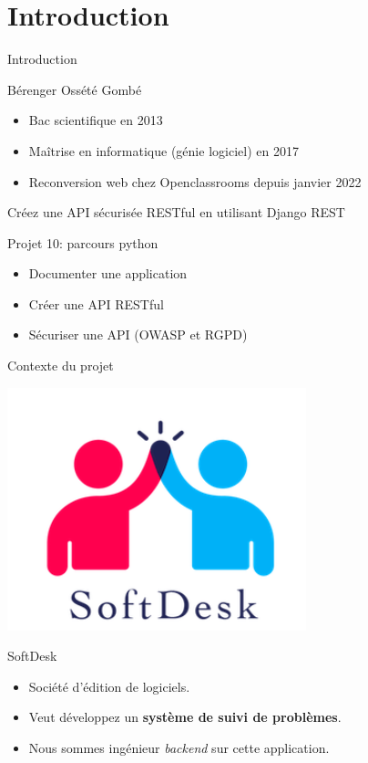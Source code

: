 \section{Introduction}

\begin{frame}{Introduction}
  \begin{block}{Bérenger Ossété Gombé}
    \begin{itemize}
    \item Bac scientifique en 2013
    \item Maîtrise en informatique (génie logiciel) en 2017
    \item Reconversion web chez Openclassrooms depuis janvier 2022
    \end{itemize}
  \end{block}
\end{frame}

\begin{frame}{Créez une API sécurisée RESTful en utilisant Django REST}
  \begin{block}{Projet 10: parcours python}
    \begin{itemize}
    \item Documenter une application
    \item Créer une API RESTful
    \item Sécuriser une API (OWASP et RGPD)
    \end{itemize}
  \end{block}
\end{frame}

\begin{frame}{Contexte du projet}
  \begin{center}
    \includegraphics[scale=0.3]{images/logo.png}
  \end{center}
  
  \begin{block}{SoftDesk}
    \begin{itemize}
    \item Société d'édition de logiciels.
    \item Veut développez un \textbf{système de suivi de problèmes}.
    \item Nous sommes ingénieur \textit{backend} sur cette
      application.
    \end{itemize}
  \end{block}
\end{frame}

